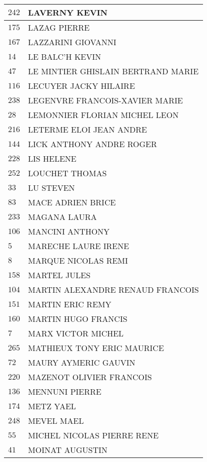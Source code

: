 \begin{xltabular}{\linewidth}{|l|X|}
    \hline
    $242$ & LAVERNY KEVIN \\
    \hline
    $175$ & LAZAG PIERRE \\
    \hline
    $167$ & LAZZARINI GIOVANNI \\
    \hline
    $14$ & LE BALC'H KEVIN \\
    \hline
    $47$ & LE MINTIER GHISLAIN BERTRAND MARIE \\
    \hline
    $116$ & LECUYER JACKY HILAIRE \\
    \hline
    $238$ & LEGENVRE FRANCOIS-XAVIER MARIE \\
    \hline
    $28$ & LEMONNIER FLORIAN MICHEL LEON \\
    \hline
    $216$ & LETERME ELOI JEAN ANDRE \\
    \hline
    $144$ & LICK ANTHONY ANDRE ROGER \\
    \hline
    $228$ & LIS HELENE \\
    \hline
    $252$ & LOUCHET THOMAS \\
    \hline
    $33$ & LU STEVEN \\
    \hline
    $83$ & MACE ADRIEN BRICE \\
    \hline
    $233$ & MAGANA LAURA \\
    \hline
    $106$ & MANCINI ANTHONY \\
    \hline
    $5$ & MARECHE LAURE IRENE \\
    \hline
    $8$ & MARQUE NICOLAS REMI \\
    \hline
    $158$ & MARTEL JULES \\
    \hline
    $104$ & MARTIN ALEXANDRE RENAUD FRANCOIS \\
    \hline
    $151$ & MARTIN ERIC REMY \\
    \hline
    $160$ & MARTIN HUGO FRANCIS \\
    \hline
    $7$ & MARX VICTOR MICHEL \\
    \hline
    $265$ & MATHIEUX TONY ERIC MAURICE \\
    \hline
    $72$ & MAURY AYMERIC GAUVIN \\
    \hline
    $220$ & MAZENOT OLIVIER FRANCOIS \\
    \hline
    $136$ & MENNUNI PIERRE \\
    \hline
    $174$ & METZ YAEL \\
    \hline
    $248$ & MEVEL MAEL \\
    \hline
    $55$ & MICHEL NICOLAS PIERRE RENE \\
    \hline
    $41$ & MOINAT AUGUSTIN \\

\end{xltabular}
